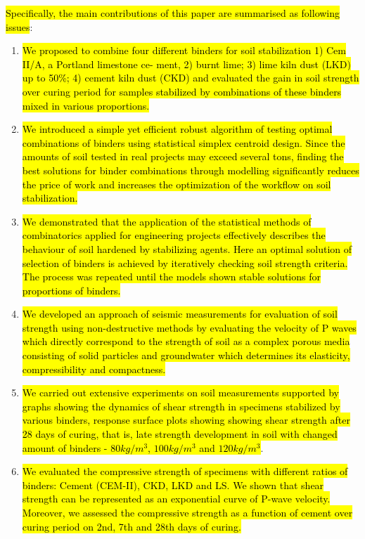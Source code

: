 \documentclass[USenglish,twocolumn]{article}
\begin{document}
\hl{Specifically, the main contributions of this paper are summarised as following issues}:
\begin{enumerate}
	\item \hl{We proposed to combine four different binders for soil stabilization  1) Cem II/A, a Portland limestone ce- ment, 2) burnt lime; 3) lime kiln dust (LKD) up to 50\%; 4) cement kiln dust (CKD) and evaluated the gain in soil strength over curing period for samples stabilized by combinations of these binders mixed in various proportions.}
	\item \hl{We introduced a simple yet efficient robust algorithm of testing optimal combinations of binders using statistical simplex centroid design. Since the amounts of soil tested in real projects may exceed several tons, finding the best solutions for binder combinations through modelling significantly reduces the price of work and increases the optimization of the workflow on soil stabilization.} 
	\item \hl{We demonstrated that the application of the statistical methods of combinatorics applied for engineering projects effectively describes the behaviour of soil hardened by stabilizing agents. Here an optimal solution of selection of binders is achieved by iteratively checking soil strength criteria. The process was repeated until the models shown stable solutions for proportions of binders.}
	\item \hl{We developed an approach of seismic measurements for evaluation of soil strength using non-destructive methods by evaluating the velocity of P waves which directly correspond to the strength of soil as a complex porous media consisting of solid particles and groundwater which determines its elasticity, compressibility and compactness.}
	\item \hl{We carried out extensive experiments on soil measurements supported by graphs showing the dynamics of shear strength in specimens stabilized by various binders, response surface plots showing showing shear strength after 28 days of curing, that is, late strength development in soil with changed amount of binders - $80 kg/m^3$, $100kg/m^3$ and $120kg/m^3$}.
	\item \hl{We evaluated the compressive strength of specimens with different ratios of binders: Cement (CEM-II), CKD, LKD and LS. We shown that shear strength can be represented as an exponential curve of P-wave velocity. Moreover, we assessed the compressive strength as a function of cement over curing period on 2nd, 7th and 28th days of curing.}
\end{enumerate}
\end{document}

